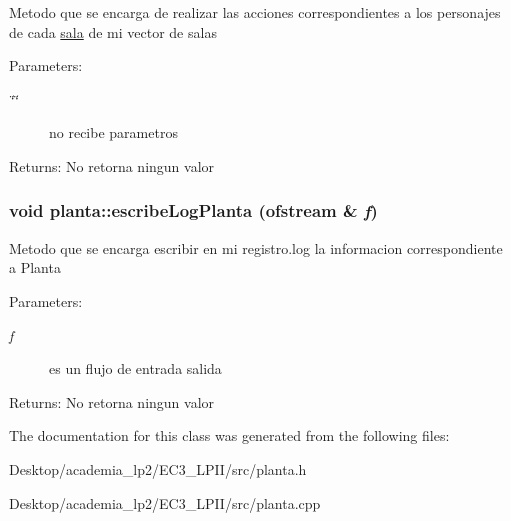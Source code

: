 Metodo que se encarga de realizar las acciones correspondientes a los personajes de cada \hyperlink{classsala}{sala} de mi vector de salas \begin{Desc}
\item[Parameters:]
\begin{description}
\item[{\em \char`\"{}\char`\"{}}]no recibe parametros \end{description}
\end{Desc}
\begin{Desc}
\item[Returns:]No retorna ningun valor \end{Desc}
\hypertarget{classplanta_715eedf1f6fab5d7daa52a2b7cbb2744}{
\subsubsection[escribeLogPlanta]{\setlength{\rightskip}{0pt plus 5cm}void planta::escribeLogPlanta (ofstream \& {\em f})}}
\label{classplanta_715eedf1f6fab5d7daa52a2b7cbb2744}


Metodo que se encarga escribir en mi registro.log la informacion correspondiente a Planta \begin{Desc}
\item[Parameters:]
\begin{description}
\item[{\em f}]es un flujo de entrada salida \end{description}
\end{Desc}
\begin{Desc}
\item[Returns:]No retorna ningun valor \end{Desc}


The documentation for this class was generated from the following files:\begin{CompactItemize}
\item 
Desktop/academia\_\-lp2/EC3\_\-LPII/src/planta.h\item 
Desktop/academia\_\-lp2/EC3\_\-LPII/src/planta.cpp\end{CompactItemize}
